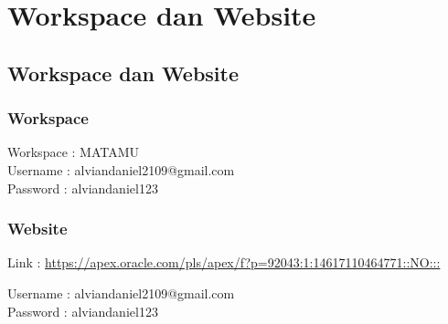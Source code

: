 \chapter{Workspace dan Website}

\section{Workspace dan Website}

\subsection{Workspace}
Workspace	: MATAMU\\
Username	: alviandaniel2109@gmail.com\\
Password	: alviandaniel123

\subsection{Website}
Link 		: \url{https://apex.oracle.com/pls/apex/f?p=92043:1:14617110464771::NO:::}
\par
Username	: alviandaniel2109@gmail.com\\
Password	: alviandaniel123

